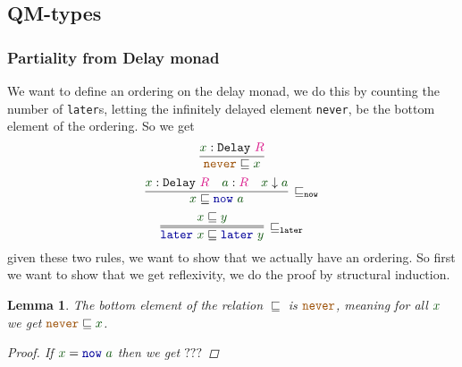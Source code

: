 \documentclass[twoside,11pt,openright]{report}
\theoremstyle{plain} %
\newtheorem{lem}[thm]{Lemma}
\theoremstyle{definition}
\theoremstyle{remark}
\newcommand*{\term}[1]{\textcolor{green!30!black}{#1}} %
\newcommand*{\type}[1]{\textcolor{magenta!90!black}{#1}}
\newcommand*{\universe}[1]{\textcolor{orange!80!black}{#1}}
\newcommand*{\unit}{\type{\textbf{1}}}
\newcommand*{\constant}[1]{\textcolor{orange!60!black}{\ensuremath{\mathtt{#1}}}}
\newcommand*{\function}[1]{\textcolor{blue!60!black}{\ensuremath{\mathtt{#1}}}}
\newcommand*{\typeformer}[1]{\ensuremath{\mathtt{#1}}}
\begin{document}

\subsection{QM-types}

\subsubsection{Partiality from Delay monad}
We want to define an ordering on the delay monad, we do this by counting the number of \texttt{later}s, letting the infinitely delayed element \texttt{never}, be the bottom element of the ordering. So we get
\begin{equation}
  \infer{\constant{never} \sqsubseteq \term{x}}{\term{x} : \typeformer{Delay}~\type{R}}
\end{equation}
\begin{equation}
  \infer[\sqsubseteq_{\mathtt{now}}]{\term{x} \sqsubseteq \function{now}~\term{a}}{\term{x} : \typeformer{Delay}~\type{R} & \term{a} : \type{R} & \term{x} \downarrow \term{a}}
\end{equation}
\begin{equation}
  \infer=[\sqsubseteq_{\mathtt{later}}]{\function{later}~\term{x} \sqsubseteq \function{later}~\term{y}}{\term{x} \sqsubseteq \term{y}}
\end{equation}
given these two rules, we want to show that we actually have an ordering. So first we want to show that we get reflexivity, we do the proof by structural induction.

\begin{lem}
  The bottom element of the relation \(\sqsubseteq\) is \(\constant{never}\), meaning for all \(\term{x}\) we get \(\constant{never} \sqsubseteq \term{x}\).
  \begin{proof}
    If \(\term{x} = \function{now}~\term{a}\) then we get \(???\)
  \end{proof}
\end{lem}
  
\end{document}
